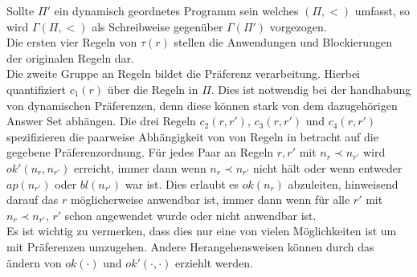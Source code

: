 Sollte $\Pi'$ ein dynamisch geordnetes Programm sein welches $(\Pi, <)$ umfasst,
so wird $\Gamma(\Pi, <)$ als Schreibweise gegenüber $\Gamma(\Pi')$ vorgezogen.\\
Die ersten vier Regeln von $\tau(r)$ stellen die Anwendungen und Blockierungen
der originalen Regeln dar.\\
Die zweite Gruppe an Regeln bildet die Präferenz verarbeitung. Hierbei
quantifiziert $c_1(r)$ über die Regeln in $\Pi$. Dies ist notwendig bei der
handhabung von dynamischen Präferenzen, denn diese können stark von dem
dazugehörigen Answer Set abhängen.
Die drei Regeln $c_2(r, r')$, $c_3(r, r')$ und $c_4(r, r')$ spezifizieren die
paarweise Abhängigkeit von von Regeln in betracht auf die gegebene
Präferenzordnung. Für jedes Paar an Regeln $r, r'$ mit $n_r \prec n_{r'}$ wird
$ok'(n_r, n_{r'})$ erreicht, immer dann wenn $n_r \prec n_{r'}$ nicht hält oder
wenn entweder $ap(n_{r'})$ oder $bl(n_{r'})$ war ist. Dies erlaubt es $ok(n_r)$
abzuleiten, hinweisend darauf das $r$ möglicherweise anwendbar ist, immer dann
wenn für alle $r'$ mit $n_r \prec n_{r'}$, $r'$ schon angewendet wurde oder
nicht anwendbar ist.\\
Es ist wichtig zu vermerken, dass dies nur eine von vielen Möglichkeiten ist
um mit Präferenzen umzugehen. Andere Herangehensweisen können durch das ändern
von $ok(\cdot)$ und $ok'(\cdot, \cdot)$ erziehlt werden.



